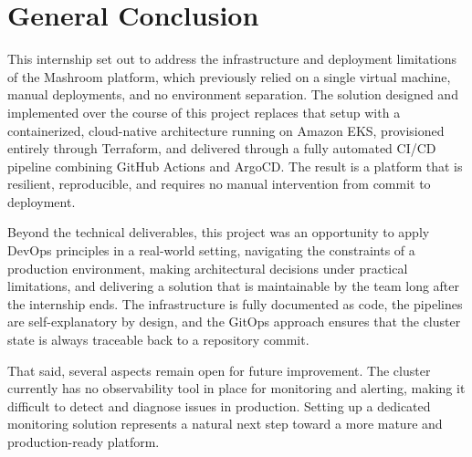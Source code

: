 \thispagestyle{plain}
\section*{General Conclusion}
This internship set out to address the infrastructure and deployment 
limitations of the Mashroom platform, which previously relied on a 
single virtual machine, manual deployments, and no environment 
separation. The solution designed and implemented over the course 
of this project replaces that setup with a containerized, 
cloud-native architecture running on Amazon EKS, provisioned 
entirely through Terraform, and delivered through a fully automated 
CI/CD pipeline combining GitHub Actions and ArgoCD. The result is 
a platform that is resilient, reproducible, and requires no manual 
intervention from commit to deployment.

Beyond the technical deliverables, this project was an opportunity 
to apply DevOps principles in a real-world setting, navigating the 
constraints of a production environment, making architectural 
decisions under practical limitations, and delivering a solution 
that is maintainable by the team long after the internship ends. 
The infrastructure is fully documented as code, the pipelines are 
self-explanatory by design, and the GitOps approach ensures that 
the cluster state is always traceable back to a repository commit.

That said, several aspects remain open for future improvement. 
The cluster currently has no observability tool in place for 
monitoring and alerting, making it difficult to detect and 
diagnose issues in production. Setting up a dedicated monitoring 
solution represents a natural next step toward a more mature 
and production-ready platform.